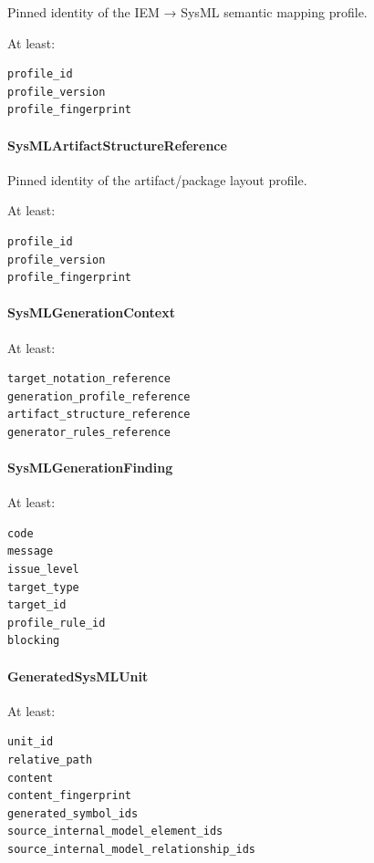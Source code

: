 Pinned identity of the IEM → SysML semantic mapping profile.

At least:

\begin{verbatim}
profile_id
profile_version
profile_fingerprint
\end{verbatim}

\hypertarget{sysmlartifactstructurereference}{%
\paragraph{SysMLArtifactStructureReference}\label{sysmlartifactstructurereference}}

Pinned identity of the artifact/package layout profile.

At least:

\begin{verbatim}
profile_id
profile_version
profile_fingerprint
\end{verbatim}

\hypertarget{sysmlgenerationcontext}{%
\paragraph{SysMLGenerationContext}\label{sysmlgenerationcontext}}

At least:

\begin{verbatim}
target_notation_reference
generation_profile_reference
artifact_structure_reference
generator_rules_reference
\end{verbatim}

\hypertarget{sysmlgenerationfinding}{%
\paragraph{SysMLGenerationFinding}\label{sysmlgenerationfinding}}

At least:

\begin{verbatim}
code
message
issue_level
target_type
target_id
profile_rule_id
blocking
\end{verbatim}

\hypertarget{generatedsysmlunit}{%
\paragraph{GeneratedSysMLUnit}\label{generatedsysmlunit}}

At least:

\begin{verbatim}
unit_id
relative_path
content
content_fingerprint
generated_symbol_ids
source_internal_model_element_ids
source_internal_model_relationship_ids
\end{verbatim}

